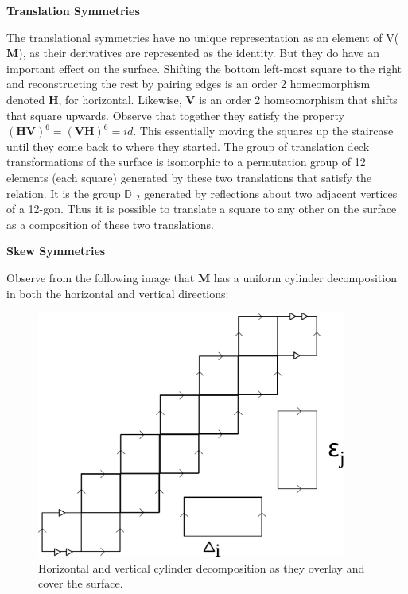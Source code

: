 \documentclass[]{article}
\begin{document}
\vspace{0.1in}

\noindent\textbf{Translation Symmetries}

The translational symmetries have no unique representation as an element of V($\mathbf M$), as their derivatives are represented as the identity. But they do have an important effect on the surface. Shifting the bottom left-most square to the right and reconstructing the rest by pairing edges is an order 2 homeomorphism denoted $\mathbf{H}$, for horizontal. Likewise, $\mathbf{V}$ is an order 2 homeomorphism that shifts that square upwards. Observe that together they satisfy the property $(\mathbf{H}\mathbf{V})^{6}=(\mathbf{V}\mathbf{H})^{6}=id$. This essentially moving the squares up the staircase until they come back to where they started. The group of translation deck transformations of the surface is isomorphic to a permutation group of 12 elements (each square) generated by these two translations that satisfy the relation. It is the group $\mathbb{D}_{12}$ generated by reflections about two adjacent vertices of a 12-gon. Thus it is possible to translate a square to any other on the surface as a composition of these two translations.

\vspace{0.1in}

\noindent\textbf{Skew Symmetries}

Observe from the following image that $\mathbf M$ has a uniform cylinder decomposition in both the horizontal and vertical directions:

\begin{figure}[H]
\centering
\includegraphics[width=4in]{cylinderdecomp.pdf}
\caption{Horizontal and vertical cylinder decomposition as they overlay and cover the surface.}
\label{fig:decomp}
\end{figure}
\end{document}
